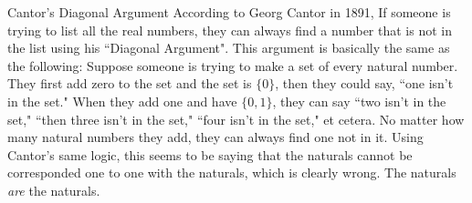 \documentclass[12pt]{article}
\begin{document}
\begin{section}{Cantor's Diagonal Argument}\label{sec:diagonal argument}
	According to Georg Cantor in 1891, If someone is trying to list all the real numbers,
	they can always find a number that is not in the list using his ``Diagonal Argument".
	This argument is basically the same as the following: Suppose someone is trying to make
	a set of every natural number. They first add zero to the set and the set is $\{0\}$,
	then they could say, ``one isn't in the set." When they add one and have $\{0,1\}$,
	they can say ``two isn't in the set," ``then three isn't in the set," ``four isn't in
	the set," et cetera. No matter how many natural numbers they add, they can always find
	one not in it. Using Cantor's same logic, this seems to be saying that the naturals
	cannot be corresponded one to one with the naturals, which is clearly wrong. The
	naturals \emph{are} the naturals.
\end{section}
\end{document}
